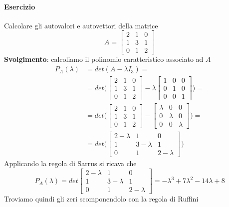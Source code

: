\documentclass[a4paper, 10pt]{article}
\begin{document}
	\paragraph*{Esercizio}
	Calcolare gli autovalori e autovettori della matrice 
	\[A = \begin{bmatrix}2 & 1 & 0 \\ 1 & 3 & 1 \\ 0 & 1 & 2 \end{bmatrix} \]
	\textbf{Svolgimento}: calcoliamo il polinomio caratteristico associato ad $A$
	\begin{equation*} 
		\begin{split}
			P_A(\lambda) &= det  (A - \lambda I_3) = \\
			&= det \biggl( \begin{bmatrix} 2 & 1 & 0 \\ 1 & 3 & 1 \\ 0 & 1 & 2
			 \end{bmatrix} - \lambda \begin{bmatrix} 1 & 0 & 0 \\ 0 & 1 & 0 \\ 0 & 0 & 1  \end{bmatrix} \biggr) = \\
			&= det \biggl( \begin{bmatrix} 2 & 1 & 0 \\ 1 & 3 & 1 \\ 0 & 1 & 2 
			 \end{bmatrix} - \begin{bmatrix} \lambda  & 0 & 0 \\ 0 & \lambda & 0 \\ 0 & 0 & \lambda \end{bmatrix} \biggr) = \\
			&= det \biggl( \begin{bmatrix}2-\lambda & 1 & 0 \\ 1 & 3- \lambda & 1 \\ 0 & 1 & 2-\lambda \end{bmatrix} \biggr)
		\end{split}
	\end{equation*}
	Applicando la regola di Sarrus si ricava che 
	\[P_A(\lambda) = det \begin{bmatrix}2-\lambda & 1 & 0 \\ 1 & 3- \lambda & 1 \\ 0 & 1 & 2-\lambda \end{bmatrix} = 
	-\lambda^3 + 7\lambda^2 - 14\lambda + 8 \]
	Troviamo quindi gli zeri scomponendolo con la regola di Ruffini
\end{document}
